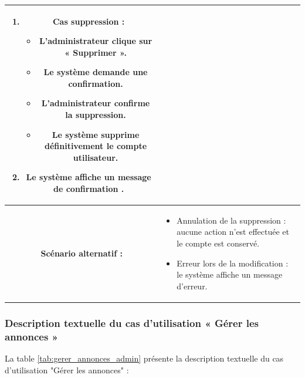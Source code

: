 \begin{longtable}{|c|p{11cm}|}
\begin{enumerate}
\item Cas suppression :
\begin{itemize}
\item L’administrateur clique sur « Supprimer ».
\item Le système demande une confirmation.
\item L’administrateur confirme la suppression.
\item Le système supprime définitivement le compte utilisateur.
\end{itemize}

\item Le système affiche un message de confirmation .
\end{enumerate} \\
\hline

\cellcolor{coloranihub}\textbf{Scénario alternatif :} &
\begin{itemize}
\item Annulation de la suppression : aucune action n’est effectuée et le compte est conservé.
\item Erreur lors de la modification : le système affiche un message d’erreur.
\end{itemize} \\
\hline
\end{longtable} 
\newpage 



\subsubsection{Description textuelle du cas d’utilisation « Gérer les annonces »}
La table \ref{tab:gerer_annonces_admin} présente la description textuelle du cas d’utilisation "Gérer les annonces" :

